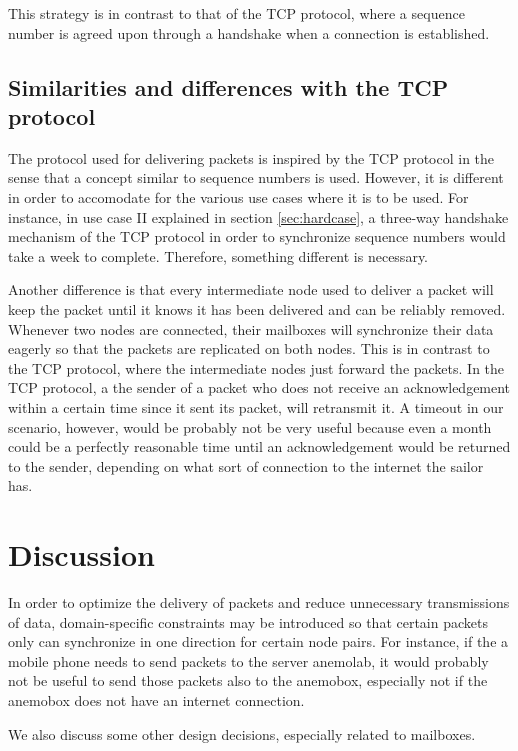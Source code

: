 \documentclass{article}
\begin{document}
This strategy is in contrast to that of the TCP protocol, where a sequence number is agreed upon through a handshake when a connection is established.

\subsection{Similarities and differences with the TCP protocol}
The protocol used for delivering packets is inspired by the TCP protocol in the sense that a concept similar to sequence numbers is used. However, it is different in order to accomodate for the various use cases where it is to be used. For instance, in use case II explained in section \ref{sec:hardcase}, a three-way handshake mechanism of the TCP protocol in order to synchronize sequence numbers would take a week to complete. Therefore, something different is necessary.

Another difference is that every intermediate node used to deliver a packet will keep the packet until it knows it has been delivered and can be reliably removed. Whenever two nodes are connected, their mailboxes will synchronize their data eagerly so that the packets are replicated on both nodes. This is in contrast to the TCP protocol, where the intermediate nodes just forward the packets. In the TCP protocol, a the sender of a packet who does not receive an acknowledgement within a certain time since it sent its packet, will retransmit it. A timeout in our scenario, however, would be probably not be very useful because even a month could be a perfectly reasonable time until an acknowledgement would be returned to the sender, depending on what sort of connection to the internet the sailor has.

\section{Discussion}
In order to optimize the delivery of packets and reduce unnecessary transmissions of data, domain-specific constraints may be introduced so that certain packets only can synchronize in one direction for certain node pairs. For instance, if the a mobile phone needs to send packets to the server anemolab, it would probably not be useful to send those packets also to the anemobox, especially not if the anemobox does not have an internet connection.

We also discuss some other design decisions, especially related to mailboxes.
\end{document}
